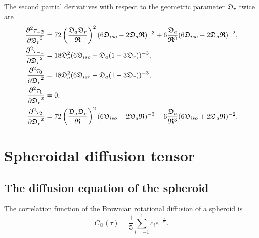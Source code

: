 The second partial derivatives with respect to the geometric parameter $\mathfrak{D}_r$ twice are
\begin{subequations}
\begin{align}
    \frac{\partial^2 \tau_{-2}}{{\partial \mathfrak{D}_r}^2} &=
        72 \left( \frac{\mathfrak{D}_a \mathfrak{D}_r}{\mathfrak{R}} \right)^2 (6\mathfrak{D}_{iso} - 2\mathfrak{D}_a\mathfrak{R})^{-3}
        + 6 \frac{\mathfrak{D}_a}{\mathfrak{R}^3} (6\mathfrak{D}_{iso} - 2\mathfrak{D}_a\mathfrak{R})^{-2}, \\
    \frac{\partial^2 \tau_{-1}}{{\partial \mathfrak{D}_r}^2} &= 18\mathfrak{D}_a^2 (6\mathfrak{D}_{iso} - \mathfrak{D}_a (1 + 3\mathfrak{D}_r))^{-3}, \\
    \frac{\partial^2 \tau_{0}}{{\partial \mathfrak{D}_r}^2}  &= 18\mathfrak{D}_a^2 (6\mathfrak{D}_{iso} - \mathfrak{D}_a (1 - 3\mathfrak{D}_r))^{-3}, \\
    \frac{\partial^2 \tau_{1}}{{\partial \mathfrak{D}_r}^2}  &= 0, \\
    \frac{\partial^2 \tau_{2}}{{\partial \mathfrak{D}_r}^2}  &= 
        72 \left( \frac{\mathfrak{D}_a \mathfrak{D}_r}{\mathfrak{R}} \right)^2 (6\mathfrak{D}_{iso} - 2\mathfrak{D}_a\mathfrak{R})^{-3}
        - 6 \frac{\mathfrak{D}_a}{\mathfrak{R}^3} (6\mathfrak{D}_{iso} + 2\mathfrak{D}_a\mathfrak{R})^{-2}.
\end{align}
\end{subequations}





\newpage
\section{Spheroidal diffusion tensor}





\subsection{The diffusion equation of the spheroid} \label{spheroid equation}

The correlation function of the Brownian rotational diffusion of a spheroid is
\begin{equation} \label{eq: spheroid correlation function}
    C_\mathrm{O}(\tau) = \frac{1}{5} \sum^1_{i=-1} c_i e^{-\frac{\tau}{\tau_i}}.
\end{equation}


